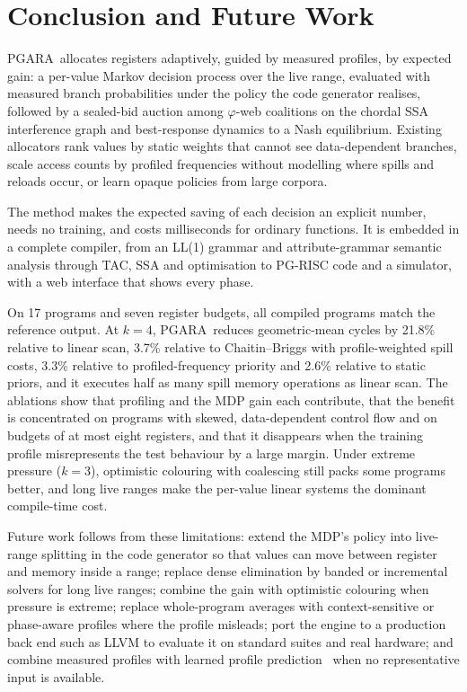 \documentclass{ieeeaccess}
\newcommand{\MG}{PGARA}
\begin{document}
\section{Conclusion and Future Work}
\label{sec:conclusion}

\MG\ allocates registers adaptively, guided by measured profiles, by
expected gain: a per-value Markov decision process over the live range,
evaluated with measured branch probabilities under the policy the code
generator realises, followed by a sealed-bid auction among
$\varphi$-web coalitions on the chordal SSA interference graph and
best-response dynamics to a Nash equilibrium. Existing allocators rank
values by static weights that cannot see data-dependent branches, scale
access counts by profiled frequencies without modelling where spills
and reloads occur, or learn opaque policies from large corpora.

The method makes the expected saving of each decision an explicit
number, needs no training, and costs milliseconds for ordinary
functions. It is embedded in a complete compiler, from an LL(1) grammar
and attribute-grammar semantic analysis through TAC, SSA and
optimisation to PG-RISC code and a simulator, with a web interface that
shows every phase.

On 17 programs and seven register budgets, all compiled programs match
the reference output. At $k=4$, \MG\ reduces geometric-mean cycles by
21.8\% relative to linear scan, 3.7\% relative to Chaitin--Briggs with
profile-weighted spill costs, 3.3\% relative to profiled-frequency
priority and 2.6\% relative to static priors, and it executes half as
many spill memory operations as linear scan. The ablations show that
profiling and the MDP gain each contribute, that the benefit is
concentrated on programs with skewed, data-dependent control flow and
on budgets of at most eight registers, and that it disappears when the
training profile misrepresents the test behaviour by a large margin.
Under extreme pressure ($k=3$), optimistic colouring with coalescing
still packs some programs better, and long live ranges make the
per-value linear systems the dominant compile-time cost.

Future work follows from these limitations: extend the MDP's policy
into live-range splitting in the code generator so that values can
move between register and memory inside a range; replace dense
elimination by banded or incremental solvers for long live ranges;
combine the gain with optimistic colouring when pressure is extreme;
replace whole-program averages with context-sensitive or phase-aware
profiles where the profile misleads; port the engine to a production
back end such as LLVM to evaluate it on standard suites and real
hardware; and combine measured profiles with learned profile
prediction~\cite{rotem2021pgo} when no representative input is
available.
\end{document}
